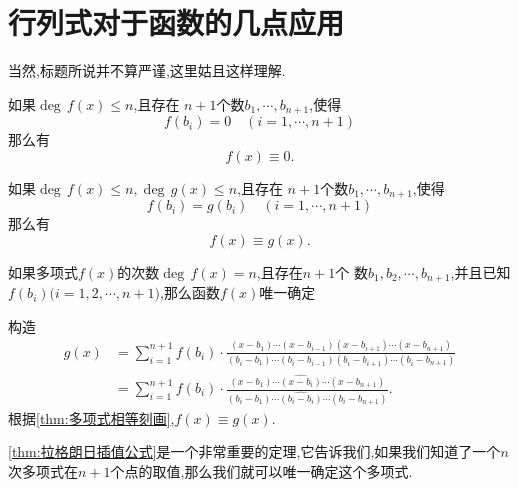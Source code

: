 \section{行列式对于函数的几点应用}
当然,标题所说并不算严谨,这里姑且这样理解.
\begin{formal}
\begin{theorem}[零多项式刻画]\label{thm:零多项式刻画}
如果$\deg\, f\left(x\right) \leqslant  n$,且存在
$n + 1$个数$b_1,\cdots,b_{n+1}$,使得\[
f\left(b_i\right)  = 0 \quad \left(i = 1,\cdots 
,n+ 1\right)
\]那么有\[
f\left(x\right)\equiv 0.
\]
\end{theorem}
\end{formal}
\begin{formal}
\begin{theorem}[多项式相等刻画]\label{thm:多项式相等刻画}
如果$\deg\, f\left(x\right) \leqslant  n,
\deg\, g\left(x\right) \leqslant  n$,且存在
$n + 1$个数$b_1,\cdots,b_{n+1}$,使得\[
f\left(b_i\right)  = g\left(b_i\right) \quad \left(i = 1,\cdots 
,n+ 1\right)
\]那么有
\[
f\left(x\right)\equiv g\left(x\right).
\]
\end{theorem}
\end{formal}
\begin{formal}
\begin{theorem}[拉格朗日插值公式]\label{thm:拉格朗日插值公式}
如果多项式$f\left(x\right)$的次数$\deg\,f\left(x\right) = n$,且存在$n + 1$个
数$b_1,b_2,\cdots,b_{n + 1}$,并且已知$f\left(b_i\right)
(i = 1,2,\cdots ,$$n + 1)$,那么函数$f\left(
    x
\right)$唯一确定
\end{theorem}
\begin{Proof}
    构造
\begin{align*}
   g\left(x\right)  &=
    \sum_{i = 1}^{n + 1}f\left(b_i\right)
    \cdot \frac{\left(x - b_1\right)\cdots
    \left(x - b_{i - 1}\right)\left(
        x - b_{i + 1}
    \right)\cdots\left(x - b_{n + 1}\right)}
    {\left(b_i - b_1\right)\cdots
    \left(b_i - b_{i - 1}\right)\left(
        b_i - b_{i + 1}
    \right)\cdots\left(b_i- b_{n + 1}\right)}\\
    & =
    \sum_{i = 1}^{n + 1}f\left(b_i\right)
    \cdot \frac{\left(x - b_1\right)\cdots
    \widehat{\left(x - b_{i}\right)}
    \cdots\left(x - b_{n + 1}\right)}
    {\left(b_i - b_1\right)\cdots
    \widehat{\left(b_i - b_{i }\right)}
    \cdots\left(b_i - b_{n + 1}\right)}.
\end{align*}
根据\cref{thm:多项式相等刻画},$f\left(x\right) \equiv g\left(x\right)$.
\end{Proof}
\end{formal}
\begin{red}
\begin{remark}
    \cref{thm:拉格朗日插值公式}是一个非常重要的定理,它告诉我们,如果我们知道了一个$n$次多项式在$n+1$个点的取值,那么我们就可以唯一确定这个多项式.
\end{remark}
\end{red}